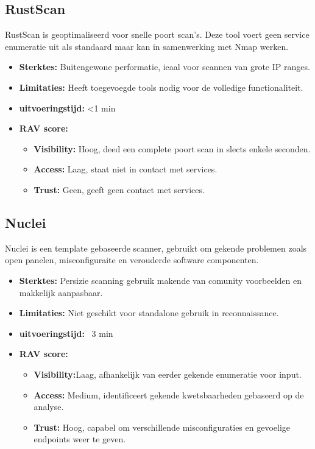 \subsection{RustScan}

RustScan is geoptimaliseerd voor snelle poort scan's. 
Deze tool voert geen service enumeratie uit als standaard maar kan in samenwerking met Nmap werken. 

\begin{itemize}
  \item \textbf{Sterktes:} Buitengewone performatie, ieaal voor scannen van grote IP ranges.
  \item \textbf{Limitaties:} Heeft toegevoegde tools nodig voor de volledige functionaliteit. 
  \item \textbf{uitvoeringstijd:} <1 min
  \item \textbf{RAV score:}
    \small{
    \begin{itemize}
      \item \textbf{Visibility:} Hoog, deed een complete poort scan in slects enkele seconden.
      \item \textbf{Access:} Laag, staat niet in contact met services. 
      \item \textbf{Trust:} Geen, geeft geen contact met services.
    \end{itemize}
    }
\end{itemize}

\subsection{Nuclei}
Nuclei is een template gebaseerde scanner, gebruikt om gekende problemen zoals open panelen, misconfiguraite en verouderde software componenten.

\begin{itemize}
  \item \textbf{Sterktes:} Persizie scanning gebruik makende van comunity voorbeelden en makkelijk aanpasbaar.
  \item \textbf{Limitaties:} Niet geschikt voor standalone gebruik in reconnaissance.
  \item \textbf{uitvoeringstijd:} ~3 min
  \item \textbf{RAV score:}
    \small{
    \begin{itemize}
      \item \textbf{Visibility:}Laag, afhankelijk van eerder gekende enumeratie voor input. 
      \item \textbf{Access:} Medium, identificeert gekende kwetsbaarheden gebaseerd op de analyse.
      \item \textbf{Trust:} Hoog, capabel om verschillende misconfiguraties en gevoelige endpoints weer te geven.
    \end{itemize}
    }
\end{itemize}

